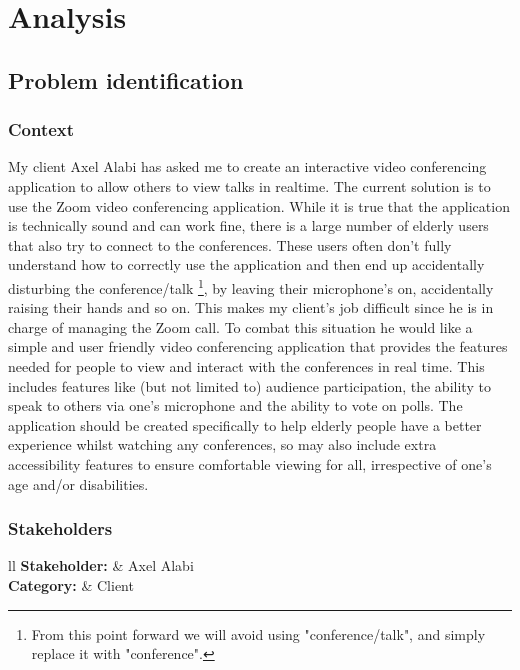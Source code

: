 \pagestyle{fancy}
\chead{\thepage}

\chapter{Analysis}

\section{Problem identification}

\subsection{Context}

My client Axel Alabi has asked me to create an interactive
video conferencing application to allow others to view talks 
in realtime. The current solution is to use the Zoom 
video conferencing application. While it is true that the 
application is technically sound and can work fine, there is a
large number of elderly users that also try to connect to the 
conferences. These users often don't fully understand how to 
correctly use the application and then end up accidentally 
disturbing the conference/talk \footnote{From this point 
forward we will avoid using "conference/talk", and simply
replace it with "conference".}, by leaving their microphone's
on, accidentally raising their hands and so on. This makes my
client's job difficult since he is in charge of managing the 
Zoom call. To combat this situation he would like a 
simple and user friendly video conferencing application that
provides the features needed for people to view and interact
with the conferences in real time. This includes 
features like (but not limited to) audience participation,
the ability to speak to others via one's microphone and the
ability to vote on polls. The application should be
created specifically to help elderly people have a better 
experience whilst watching any conferences, so may also
include extra accessibility features to ensure comfortable
viewing for all, irrespective of one's age and/or disabilities.

\subsection{Stakeholders}

\begin{tblr}{ll}
  \textbf{Stakeholder: } & Axel Alabi\\
  \textbf{Category: } & Client\\
\end{tblr}
\vspace{0.2cm}

